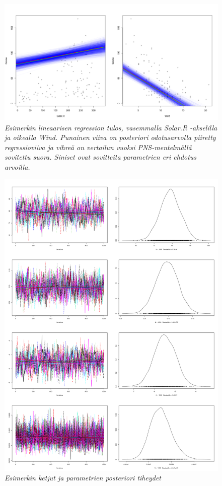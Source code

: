 \begin{figure}[h!]
	\includegraphics[width=\textwidth]{gibbsexample}
	\caption[Regressio]{\textit{Esimerkin lineaarisen regression tulos, vasemmalla Solar.R -akselilla ja oikealla Wind. Punainen viiva on posteriori odotusarvolla piiretty regressioviiva ja vihreä on vertailun vuoksi PNS-mentelmällä sovitettu suora. Siniset ovat sovitteita parametrien eri ehdotus arvoilla.}}
	\label{kuva1}
\end{figure}

\begin{figure}[h!]
	\includegraphics[width=\textwidth]{gibbs2}
	\caption[]{\textit{Esimerkin ketjut ja parametrien posteriori tiheydet}}
	\label{kuva1}
\end{figure}



